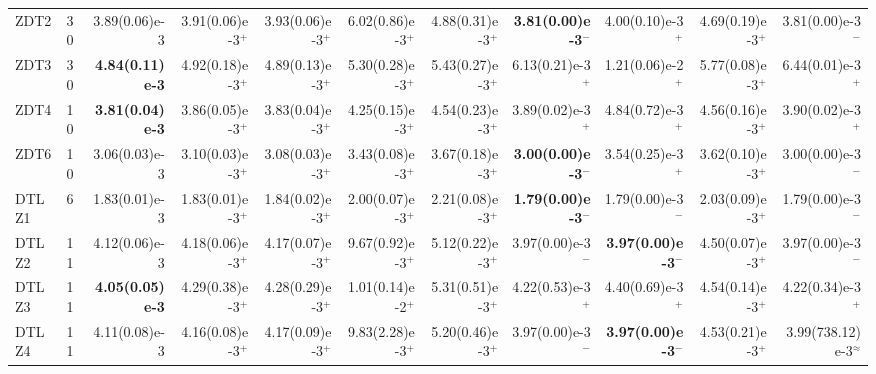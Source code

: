 \documentclass[pdflatex,sn-mathphys-ay]{sn-jnl}%
\theoremstyle{thmstyleone}%
\theoremstyle{thmstyletwo}%
\theoremstyle{thmstylethree}%
\begin{document}
\begin{landscape}
{\begin{longtable}{llrrrrrrrrr}
			ZDT2                              & 30  & 3.89(0.06)e-3          & 3.91(0.06)e-3$^{+}$                & 3.93(0.06)e-3$^{+}$          & 6.02(0.86)e-3$^{+}$       & 4.88(0.31)e-3$^{+}$       & \textbf{3.81(0.00)e-3}$^{-}$ & 4.00(0.10)e-3$^{+}$          & 4.69(0.19)e-3$^{+}$          & 3.81(0.00)e-3$^{-}$         \\
			ZDT3                              & 30  & \textbf{4.84(0.11)e-3} & 4.92(0.18)e-3$^{+}$                & 4.89(0.13)e-3$^{+}$          & 5.30(0.28)e-3$^{+}$       & 5.43(0.27)e-3$^{+}$       & 6.13(0.21)e-3$^{+}$          & 1.21(0.06)e-2$^{+}$          & 5.77(0.08)e-3$^{+}$          & 6.44(0.01)e-3$^{+}$         \\
			ZDT4                              & 10  & \textbf{3.81(0.04)e-3} & 3.86(0.05)e-3$^{+}$                & 3.83(0.04)e-3$^{+}$          & 4.25(0.15)e-3$^{+}$       & 4.54(0.23)e-3$^{+}$       & 3.89(0.02)e-3$^{+}$          & 4.84(0.72)e-3$^{+}$          & 4.56(0.16)e-3$^{+}$          & 3.90(0.02)e-3$^{+}$         \\
			ZDT6                              & 10  & 3.06(0.03)e-3          & 3.10(0.03)e-3$^{+}$                & 3.08(0.03)e-3$^{+}$          & 3.43(0.08)e-3$^{+}$       & 3.67(0.18)e-3$^{+}$       & \textbf{3.00(0.00)e-3}$^{-}$ & 3.54(0.25)e-3$^{+}$          & 3.62(0.10)e-3$^{+}$          & 3.00(0.00)e-3$^{-}$         \\
			\midrule
			DTLZ1                             & 6   & 1.83(0.01)e-3          & 1.83(0.01)e-3$^{+}$                & 1.84(0.02)e-3$^{+}$          & 2.00(0.07)e-3$^{+}$       & 2.21(0.08)e-3$^{+}$       & \textbf{1.79(0.00)e-3}$^{-}$ & 1.79(0.00)e-3$^{-}$          & 2.03(0.09)e-3$^{+}$          & 1.79(0.00)e-3$^{-}$         \\
			DTLZ2                             & 11  & 4.12(0.06)e-3          & 4.18(0.06)e-3$^{+}$                & 4.17(0.07)e-3$^{+}$          & 9.67(0.92)e-3$^{+}$       & 5.12(0.22)e-3$^{+}$       & 3.97(0.00)e-3$^{-}$          & \textbf{3.97(0.00)e-3}$^{-}$ & 4.50(0.07)e-3$^{+}$          & 3.97(0.00)e-3$^{-}$         \\
			DTLZ3                             & 11  & \textbf{4.05(0.05)e-3} & 4.29(0.38)e-3$^{+}$                & 4.28(0.29)e-3$^{+}$          & 1.01(0.14)e-2$^{+}$       & 5.31(0.51)e-3$^{+}$       & 4.22(0.53)e-3$^{+}$          & 4.40(0.69)e-3$^{+}$          & 4.54(0.14)e-3$^{+}$          & 4.22(0.34)e-3$^{+}$         \\
			DTLZ4                             & 11  & 4.11(0.08)e-3          & 4.16(0.08)e-3$^{+}$                & 4.17(0.09)e-3$^{+}$          & 9.83(2.28)e-3$^{+}$       & 5.20(0.46)e-3$^{+}$       & 3.97(0.00)e-3$^{-}$          & \textbf{3.97(0.00)e-3}$^{-}$ & 4.53(0.21)e-3$^{+}$          & 3.99(738.12)e-3$^{\approx}$ \\

\end{longtable}}
\end{landscape}
\end{document}
